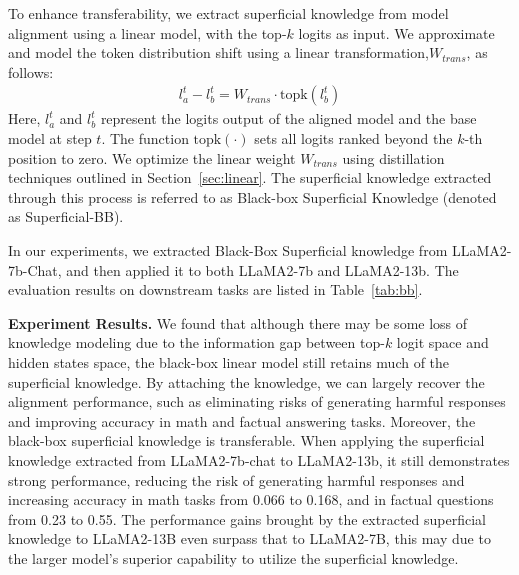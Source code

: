 To enhance transferability, we extract superficial knowledge from model alignment using a linear model, with the top-$k$ logits as input. We approximate and model the token distribution shift using a linear transformation,$W_{trans}$, as follows:
\begin{align}
l_a^t - l_b^t = W_{trans} \cdot \text{topk}(l_b^t)
\end{align}
Here,  $l_a^t$ and $l_b^t$ represent the logits output of the aligned model and the base model at step $t$. The function $\text{topk}(\cdot)$ sets all logits ranked beyond the $k$-th position to zero. We optimize the linear weight $W_{trans}$ using distillation techniques outlined in Section~\ref{sec:linear}. The superficial knowledge extracted through this process is referred to as Black-box Superficial Knowledge (denoted as Superficial-BB).




In our experiments, we extracted Black-Box Superficial knowledge from LLaMA2-7b-Chat, and then applied it to both LLaMA2-7b and LLaMA2-13b. The evaluation results on  downstream tasks are listed in Table~\ref{tab:bb}. 

\textbf{Experiment Results.} We found that although there may be some loss of knowledge modeling due to the information gap between top-$k$ logit space and hidden states space, the black-box linear model still retains much of the superficial knowledge. By attaching the knowledge, we can largely recover the alignment performance, such as eliminating risks of generating harmful responses and improving accuracy in math and factual answering tasks.
Moreover, the black-box superficial knowledge is transferable. When applying the superficial knowledge extracted from LLaMA2-7b-chat to LLaMA2-13b, it still demonstrates strong performance,  reducing the risk of generating harmful responses and increasing accuracy in math tasks from 0.066 to 0.168, and in factual questions from 0.23 to 0.55. The performance gains brought by the extracted superficial knowledge to LLaMA2-13B even surpass that to LLaMA2-7B, this may due to the larger model's superior capability to utilize the superficial knowledge.

